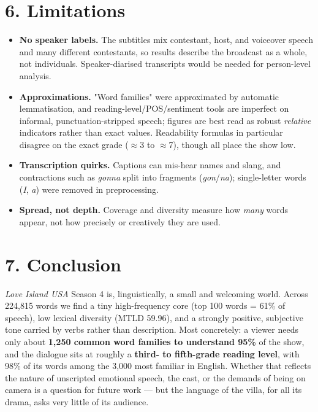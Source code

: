 \documentclass[11pt]{article}
\begin{document}
\section*{6. Limitations}

\begin{itemize}
\item \textbf{No speaker labels.} The subtitles mix contestant, host, and voiceover speech and many different contestants, so results describe the broadcast as a whole, not individuals. Speaker-diarised transcripts would be needed for person-level analysis.
\item \textbf{Approximations.} "Word families" were approximated by automatic lemmatisation, and reading-level/POS/sentiment tools are imperfect on informal, punctuation-stripped speech; figures are best read as robust \emph{relative} indicators rather than exact values. Readability formulas in particular disagree on the exact grade ($\approx$3 to $\approx$7), though all place the show low.
\item \textbf{Transcription quirks.} Captions can mis-hear names and slang, and contractions such as \emph{gonna} split into fragments (\emph{gon}/\emph{na}); single-letter words (\emph{I}, \emph{a}) were removed in preprocessing.
\item \textbf{Spread, not depth.} Coverage and diversity measure how \emph{many} words appear, not how precisely or creatively they are used.
\end{itemize}


\section*{7. Conclusion}

\emph{Love Island USA} Season 4 is, linguistically, a small and welcoming world. Across 224,815 words we find a tiny high-frequency core (top 100 words = 61\% of speech), low lexical diversity (MTLD 59.96), and a strongly positive, subjective tone carried by verbs rather than description. Most concretely: a viewer needs only about \textbf{1,250 common word families to understand 95\%} of the show, and the dialogue sits at roughly a \textbf{third- to fifth-grade reading level}, with 98\% of its words among the 3,000 most familiar in English. Whether that reflects the nature of unscripted emotional speech, the cast, or the demands of being on camera is a question for future work --- but the language of the villa, for all its drama, asks very little of its audience.
\end{document}
